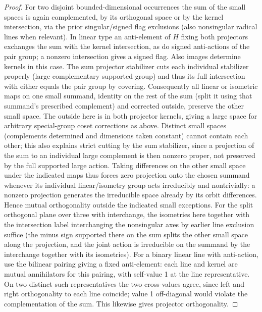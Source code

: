 \begin{proof}
For two disjoint bounded-dimensional occurrences the sum of the small spaces is again complemented, by
its orthogonal space or by the kernel intersection, via the prior singular/signed flag exclusions (also
nonsingular radical lines when relevant). In linear type an anti-element of \(H\) fixing both projectors
exchanges the sum with the kernel intersection, as do signed anti-actions of the pair group; a nonzero
intersection gives a signed flag. Also images determine kernels in this case. The sum projector
stabilizer cuts each individual stabilizer properly (large complementary supported group) and thus its
full intersection with either equals the pair group by covering. Consequently all linear or isometric
maps on one small summand, identity on the rest of the sum (split it using that summand's prescribed
complement) and corrected outside, preserve the other small space. The outside here is in both projector
kernels, giving a large space for arbitrary special-group coset corrections as above. Distinct small
spaces (complements determined and dimensions taken constant) cannot contain each other; this also
explains strict cutting by the sum stabilizer, since a projection of the sum to an individual large
complement is then nonzero proper, not preserved by the full supported large action. Taking differences
on the other small space under the indicated maps thus forces zero projection onto the chosen summand
whenever its individual linear/isometry group acts irreducibly and nontrivially: a nonzero projection
generates the irreducible space already by its orbit differences. Hence mutual orthogonality outside the
indicated small exceptions. For the split orthogonal plane over three with interchange, the isometries
here together with the intersection label interchanging the nonsingular axes by earlier line exclusion
suffice (the minus sign supported there on the sum splits the other small space along the projection, and
the joint action is irreducible on the summand by the interchange together with its isometries). For a
binary linear line with anti-action, use the bilinear pairing giving a fixed anti-element: each line and
kernel are mutual annihilators for this pairing, with self-value 1 at the line representative. On two
distinct such representatives the two cross-values agree, since left and right orthogonality to each line
coincide; value 1 off-diagonal would violate the complementation of the sum. This likewise gives
projector orthogonality.

\end{proof}

